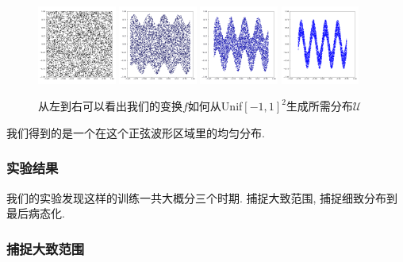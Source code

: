\documentclass[lang=cn,11pt]{elegantpaper}
\begin{document}
\begin{figure}[hbt]
\centering
  \includegraphics[width=0.23\textwidth]{sin_1_1}  
  \includegraphics[width=0.23\textwidth]{sin_1_2}
  \includegraphics[width=0.23\textwidth]{sin_1_3}
  \includegraphics[width=0.23\textwidth]{sin_1_4}
  \caption{从左到右可以看出我们的变换$f$如何从Unif$[-1,1]^2$生成所需分布$\mathcal U$}
\end{figure}

我们得到的是一个在这个正弦波形区域里的均匀分布.

\subsubsection{实验结果}

我们的实验发现这样的训练一共大概分三个时期. 捕捉大致范围, 捕捉细致分布到最后病态化.

\subsubsection{捕捉大致范围}
\end{document}
